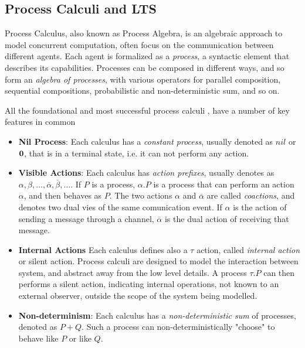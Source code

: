 \subsection{Process Calculi and LTS}


Process Calculus, also known as Process Algebra, is an algebraic approach to model concurrent computation, often focus on the communication between different agents. Each agent is formalized as a \textit{process}, a syntactic element that describes its capabilities. Processes can be composed in different ways, and so form an \textit{algebra of processes}, with various operators for parallel composition, sequential compositions, probabilistic and non-deterministic sum, and so on.

All the foundational and most successful process calculi \cite{milnerCalculusCommunicatingSystems1980, bergstraAlgebraCommunicatingProcesses1985, 
hoareCommunicatingSequentialProcesses1978, milnerCommunicatingMobileSystems1999},  have a number of key features in common \begin{itemize}
\item \textbf{Nil Process}: Each calculus has a \textit{constant process}, usually denoted as $nil$ or $\mathbf{0}$, that is in a terminal state, i.e. it can not perform any action.
\item \textbf{Visible Actions}: Each calculus has \textit{action prefixes}, usually denotes as $\alpha, \beta, \ldots, \overline{\alpha}, \overline{\beta}, \ldots$. If $P$ is a process, $\alpha.P$ is a process that can perform an action $\alpha$, and then behaves as $P$. The two actions $\alpha$ and $\overline{\alpha}$ are called \textit{coactions}, and denotes two dual vies of the same comunication event. If $\alpha$ is the action of sending a message through a channel, $\overline{\alpha}$ is the dual action of receiving that message. 
\item \textbf{Internal Actions} Each calculus defines also a $\tau$ action, called \textit{internal action} or silent action. Process calculi are designed to model the interaction between system, and abstract away from the low level details. A process $\tau.P$ can then performs a silent action, indicating internal operations, not known to an external observer, outside the scope of the system being modelled. 
\item \textbf{Non-determinism}: Each calculus has a \textit{non-deterministic sum} of processes, denoted as $P + Q$. Such a process can non-deterministically "choose" to behave like $P$ or like $Q$. 

\end{itemize}
